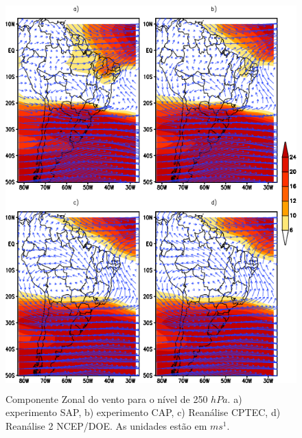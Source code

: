 \begin{figure}[!hbp]
\centering
\includegraphics[height=15cm]{./figs/media_vento-zonal_anl_250hPa.png}
\caption{Componente Zonal do vento para o nível de 250 $hPa$. a) experimento SAP, b) experimento CAP, c) Reanálise CPTEC, d) Reanálise 2 NCEP/DOE. As unidades estão em $ms^{1}$.}
\label{fig16}
\end{figure}

